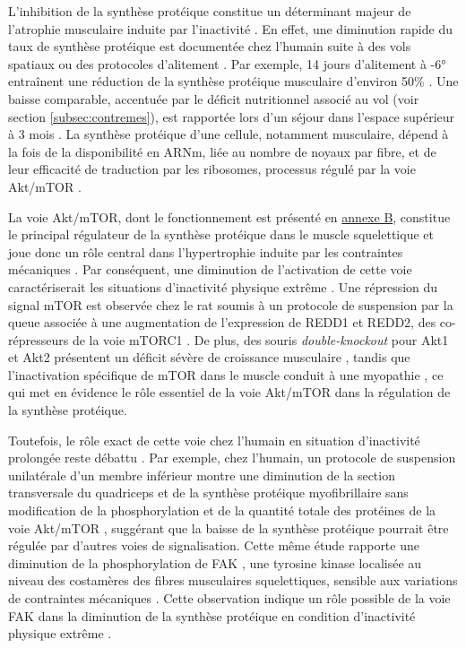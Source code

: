 \documentclass[11pt]{report}
\begin{document}
L'inhibition de la synthèse protéique constitue un déterminant majeur de l'atrophie musculaire induite par l'inactivité \parencite{Bodine2013Oct,Gao2018Mar}. En effet, une diminution rapide du taux de synthèse protéique est documentée chez l'humain suite à des vols spatiaux ou des protocoles d'alitement \parencite{Chopard2009Sep}. Par exemple, 14 jours d'alitement à -6° entraînent une réduction de la synthèse protéique musculaire d'environ 50\% \parencite{Ferrando1996Apr}. Une baisse comparable, accentuée par le déficit nutritionnel associé au vol (voir section \ref{subsec:contremes}), est rapportée lors d'un séjour dans l'espace supérieur à 3 mois \parencite{Stein1999Jun}. La synthèse protéique d'une cellule, notamment musculaire, dépend à la fois de la disponibilité en ARNm, liée au nombre de noyaux par fibre, et de leur efficacité de traduction par les ribosomes, processus régulé par la voie Akt/mTOR \parencite{Sirago2022Nov}.

La voie Akt/mTOR, dont le fonctionnement est présenté en \hyperref[annexeB]{annexe B}, constitue le principal régulateur de la synthèse protéique dans le muscle squelettique et joue donc un rôle central dans l'hypertrophie induite par les contraintes mécaniques \parencite{Bodine2001Nov,Egerman2013Nov, Roberts2023Oct}. Par conséquent, une diminution de l'activation de cette voie caractériserait les situations d'inactivité physique extrême \parencite{Chopard2009Sep}. Une répression du signal mTOR est observée chez le rat soumis à un protocole de suspension par la queue associée à une augmentation de l'expression de REDD1 et REDD2, des co-répresseurs de la voie mTORC1 \parencite{Kelleher2015Jan,Kelleher2013Jan}. De plus, des souris \textit{double-knockout} pour Akt1 et Akt2 présentent un déficit sévère de croissance musculaire \parencite{Peng2003Jun}, tandis que l'inactivation spécifique de mTOR dans le muscle conduit à une myopathie \parencite{Risson2009Dec}, ce qui met en évidence le rôle essentiel de la voie Akt/mTOR dans la régulation de la synthèse protéique. 

Toutefois, le rôle exact de cette voie chez l'humain en situation d'inactivité prolongée reste débattu \parencite{Gao2018Mar}. Par exemple, chez l'humain, un protocole de suspension unilatérale d'un membre inférieur montre une diminution de la section transversale du quadriceps et de la synthèse protéique myofibrillaire sans modification de la phosphorylation et de la quantité totale des protéines de la voie Akt/mTOR \parencite{deBoer2007Nov}, suggérant que la baisse de la synthèse protéique pourrait être régulée par d'autres voies de signalisation. Cette même étude rapporte une diminution de la phosphorylation de FAK \parencite{deBoer2007Nov}, une tyrosine kinase localisée au niveau des costamères des fibres musculaires squelettiques, sensible aux variations de contraintes mécaniques \parencite{Graham2015Oct}. Cette observation indique un rôle possible de la voie FAK dans la diminution de la synthèse protéique en condition d'inactivité physique extrême \parencite{Gao2018Mar}. 
\end{document}
